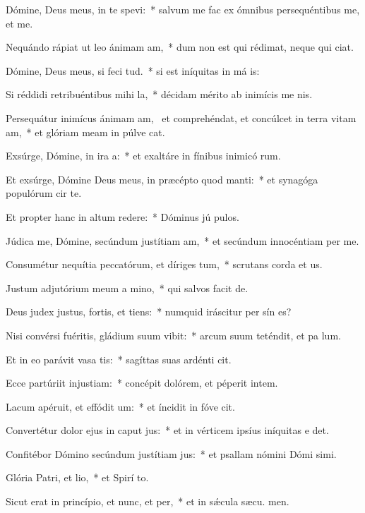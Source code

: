\item Dómine, Deus meus, in te spevi:~* salvum me fac ex ómnibus persequéntibus me, et  me.
\item Nequándo rápiat ut leo ánimam am,~* dum non est qui rédimat, neque qui  ciat.
\item Dómine, Deus meus, si feci tud.~* si est iníquitas in má is:
\item Si réddidi retribuéntibus mihi la,~* décidam mérito ab inimícis me nis.
\item Persequátur inimícus ánimam am,~\pscross{} et comprehéndat, et concúlcet in terra vitam am,~* et glóriam meam in púlve cat.
\item Exsúrge, Dómine, in ira a:~* et exaltáre in fínibus inimicó rum.
\item Et exsúrge, Dómine Deus meus, in præcépto quod manti:~* et synagóga populórum cir te.
\item Et propter hanc in altum redere:~* Dóminus jú pulos.
\item Júdica me, Dómine, secúndum justítiam am,~* et secúndum innocéntiam  per me.
\item Consumétur nequítia peccatórum, et díriges tum,~* scrutans corda et  us.
\item Justum adjutórium meum a mino,~* qui salvos facit  de.
\item Deus judex justus, fortis, et tiens:~* numquid iráscitur per sín es?
\item Nisi convérsi fuéritis, gládium suum vibit:~* arcum suum teténdit, et pa lum.
\item Et in eo parávit vasa tis:~* sagíttas suas ardénti cit.
\item Ecce partúriit injustiam:~* concépit dolórem, et péperit intem.
\item Lacum apéruit, et effódit um:~* et íncidit in fóve  cit.
\item Convertétur dolor ejus in caput jus:~* et in vérticem ipsíus iníquitas e det.
\item Confitébor Dómino secúndum justítiam jus:~* et psallam nómini Dómi simi.
\item Glória Patri, et lio,~* et Spirí to.
\item Sicut erat in princípio, et nunc, et per,~* et in sǽcula sæcu. men.
